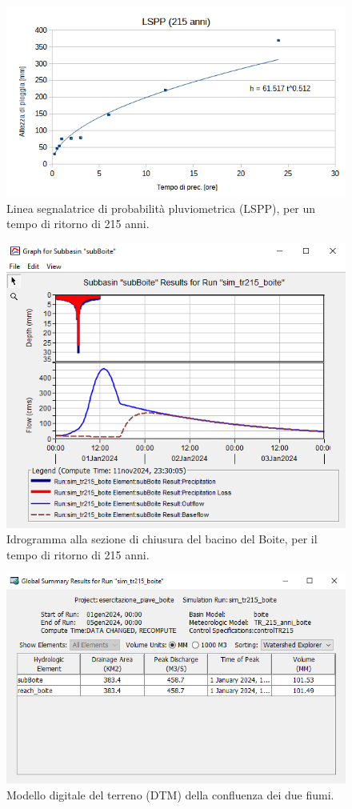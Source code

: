 \begin{figure}[htb] \centering
\includegraphics[scale=0.7]{immagini/LSPP_215.png}
\caption{Linea segnalatrice di probabilità pluviometrica (LSPP), per un tempo di ritorno di 215 anni.}
\label{figure:LSPP_215}    
\end{figure}

\begin{figure}[htb] \centering
\includegraphics[scale=0.6]{immagini/boite_215.PNG}
\caption{Idrogramma alla sezione di chiusura del bacino del Boite, per il tempo di ritorno di 215 anni.}
\label{minipage:boite_215}    
    \end{figure}


    \begin{figure}[htb] \centering
        \includegraphics[scale=0.6]{immagini/risul_boite_215.PNG}
\caption{Modello digitale del terreno (DTM) della confluenza dei due fiumi.}
\label{minipage:risul_boite_215}
        \end{figure}

